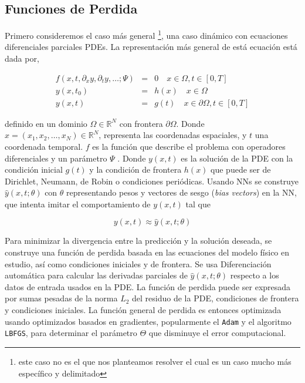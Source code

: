 \subsection{Funciones de Perdida}

Primero consideremos el caso más general \footnote{este caso no es el que nos planteamos resolver el cual es un caso mucho más específico y delimitado}, una caso dinámico con ecuaciones diferenciales parciales PDEs. La representación más general de está ecuación está dada por, 

\begin{eqnarray}
	f\left(x, t, \partial_x y, \partial_t y, \dots; \Psi\right) &=& 0 \quad x \in \Omega, t  \in [0, T] \\
	y(x, t_0) &=& h(x) \quad x \in \Omega \\
	y(x,t) &=& g(t) \quad x \in \partial\Omega, t \in [0,T]
\end{eqnarray}

definido en un dominio $\Omega \in \mathbb{R}^N$  con frontera $\partial\Omega$. Donde $x = (x_1, x_2, \dots, x_N) \in \mathbb{R}^N$, representa las coordenadas espaciales, y $t$ una coordenada temporal. $f$ es la función que describe el problema con operadores diferenciales y un parámetro $\Psi$ .  Donde $y(x,t)$ es la solución de la PDE con la condición inicial $g(t)$ y la condición de frontera $h(x)$ que puede ser de Dirichlet, Neumann, de Robin o condiciones periódicas. Usando NNs se construye $\hat{y}(x,t; \theta)$ con $\theta$ representando pesos y vectores de sesgo (\textit{bias vectors}) en la NN, que intenta imitar el comportamiento de $y(x,t)$ tal que

\begin{equation}
	y(x,t) \approx \hat{y}(x,t; \theta)
\end{equation}

Para minimizar la divergencia entre la predicción y la solución deseada, se construye una función de perdida basada en las ecuaciones del modelo físico en estudio, así como condiciones iniciales y de frontera. Se usa Diferenciación automática para calcular las derivadas parciales de $\hat{y}(x,t;\theta)$ respecto a los datos de entrada usados en la PDE. La función de perdida puede ser expresada por sumas pesadas de la norma $L_2$ del residuo de la PDE, condiciones de frontera y condiciones iniciales. La función general de perdida es entonces optimizada usando optimizados basados en gradientes, popularmente el \texttt{Adam} y el algoritmo \texttt{LBFGS}, para determinar el parámetro $\Theta$ que disminuye el error computacional.

